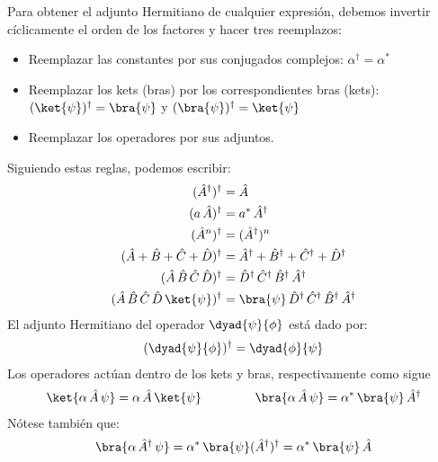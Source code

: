 Para obtener el adjunto Hermitiano de cualquier expresión, debemos invertir cíclicamente el orden de los factores y hacer tres reemplazos:
\begin{itemize}
\item Reemplazar las constantes por sus conjugados complejos: $\alpha^{\dagger} = \alpha^{*}$
\item Reemplazar los kets (bras) por los correspondientes bras (kets): $(\ket{\psi})^{\dagger} = \bra{\psi}$ y $(\bra{\psi})^{\dagger} = \ket{\psi}$
\item Reemplazar los operadores por sus adjuntos.
\end{itemize}
Siguiendo estas reglas, podemos escribir:
\begin{align}
(\hat{A}^{\dagger})^{\dagger} &= \hat{A} \label{eq:ecuacion_02_61} \\
(a \, \hat{A})^{\dagger} &= a^{*} \, \hat{A}^{\dagger} \label{eq:ecuacion_02_62} \\
(\hat{A}^{n})^{\dagger} &= (\hat{A}^{\dagger})^{n} \label{eq:ecuacion_02_63} \\
(\hat{A} + \hat{B} + \hat{C} + \hat{D})^{\dagger} &= \hat{A}^{\dagger} + \hat{B}^{\dagger} + \hat{C}^{\dagger} + \hat{D}^{\dagger} \label{eq:ecuacion_02_64} \\
(\hat{A} \, \hat{B} \, \hat{C} \, \hat{D})^{\dagger} &= \hat{D}^{\dagger} \, \hat{C}^{\dagger} \, \hat{B}^{\dagger} \, \hat{A}^{\dagger} \label{eq:ecuacion_02_65} \\
(\hat{A} \, \hat{B} \, \hat{C} \, \hat{D} \, \ket{\psi})^{\dagger} &= \bra{\psi} \, \hat{D}^{\dagger} \, \hat{C}^{\dagger} \, \hat{B}^{\dagger} \, \hat{A}^{\dagger} \label{eq:ecuacion_02_66}
\end{align}
El adjunto Hermitiano del operador $\dyad{\psi}{\phi}$ está dado por:
\begin{align}
(\dyad{\psi}{\phi})^{\dagger} = \dyad{\phi}{\psi}
\label{eq:ecuacion_02_67}
\end{align}
Los operadores actúan dentro de los kets y bras, respectivamente como sigue
\begin{align}
\ket{\alpha \, \hat{A} \, \psi} = \alpha \, \hat{A} \, \ket{\psi} \hspace{1.5cm} \bra{\alpha \, \hat{A} \, \psi} = \alpha^{*} \, \bra{\psi} \, \hat{A}^{\dagger} \label{eq:ecuacion_02_68}
\end{align}
Nótese también que:
\begin{align*}
\bra{\alpha \, \hat{A}^{\dagger} \, \psi} = \alpha^{*} \, \bra{\psi} (\hat{A}^{\dagger})^{\dagger} = \alpha^{*} \, \bra{\psi} \, \hat{A}
\end{align*}
